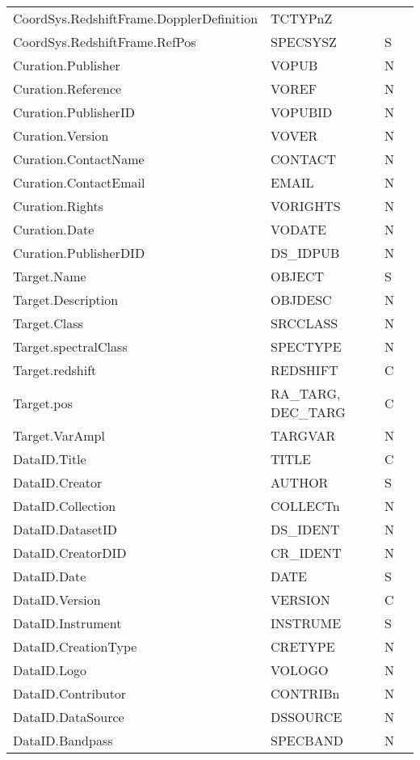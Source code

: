 {{\begin{minipage}[l]{6.5in}
\begin{tabular}{llll}
CoordSys.RedshiftFrame.DopplerDefinition &TCTYPnZ  &  & \\
CoordSys.RedshiftFrame.RefPos & SPECSYSZ & S  &   \\
Curation.Publisher &VOPUB &N \\
Curation.Reference& VOREF &N \\
Curation.PublisherID &VOPUBID&N    \\
Curation.Version&VOVER&N\\
Curation.ContactName&CONTACT&N \\
Curation.ContactEmail&EMAIL &N \\
Curation.Rights & VORIGHTS &N\\
Curation.Date  & VODATE  &N\\
Curation.PublisherDID  &DS\_IDPUB & N\\
Target.Name   & OBJECT       &S \\
Target.Description & OBJDESC&N\\
Target.Class  & SRCCLASS    &N \\
Target.spectralClass & SPECTYPE&N\\
Target.redshift& REDSHIFT  & C\\ 
Target.pos & RA\_TARG, DEC\_TARG& C\\
Target.VarAmpl & TARGVAR & N\\
DataID.Title    & TITLE    & C\\
DataID.Creator    & AUTHOR &S \\
DataID.Collection & COLLECTn& N\\ 
DataID.DatasetID& DS\_IDENT & N\\
DataID.CreatorDID& CR\_IDENT & N\\
DataID.Date    & DATE  & S\\
DataID.Version & VERSION& C \\
DataID.Instrument & INSTRUME & S\\
DataID.CreationType    & CRETYPE&N\\
DataID.Logo&VOLOGO       & N\\
DataID.Contributor&CONTRIBn&N\\
DataID.DataSource&DSSOURCE & N\\
DataID.Bandpass  & SPECBAND & N\\
\end{tabular}
\end{minipage}
}

}
